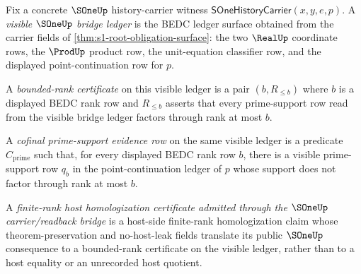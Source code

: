 \begin{definition}
\label{def:sone-visible-finite-rank-prime-support-ledgers}
Fix a concrete $\SOneUp$ history-carrier witness
$\mathsf{SOneHistoryCarrier}(x,y,e,p)$. A \emph{visible $\SOneUp$ bridge
ledger} is the BEDC ledger surface obtained from the carrier fields of
\autoref{thm:s1-root-obligation-surface}: the two $\RealUp$ coordinate rows,
the $\ProdUp$ product row, the unit-equation classifier row, and the displayed
point-continuation row for $p$.

A \emph{bounded-rank certificate} on this visible ledger is a pair
$(b,R_{\le b})$ where $b$ is a displayed BEDC rank row and $R_{\le b}$ asserts
that every prime-support row read from the visible bridge ledger factors
through rank at most $b$.

A \emph{cofinal prime-support evidence row} on the same visible ledger is a
predicate $C_{\mathrm{prime}}$ such that, for every displayed BEDC rank row $b$,
there is a visible prime-support row $q_b$ in the point-continuation ledger of
$p$ whose support does not factor through rank at most $b$.

A \emph{finite-rank host homologization certificate admitted through the
$\SOneUp$ carrier/readback bridge} is a host-side finite-rank homologization
claim whose theorem-preservation and no-host-leak fields translate its public
$\SOneUp$ consequence to a bounded-rank certificate on the visible ledger,
rather than to a host equality or an unrecorded host quotient.
\end{definition}

